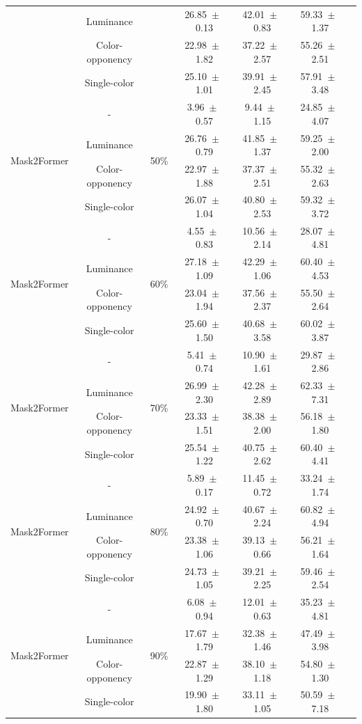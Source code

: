 \begin{table}[h]
\begin{tabular}{@{}lccc ccc@{}}
& Luminance & & 26.85~$\pm$~0.13 & 42.01~$\pm$~0.83 & 59.33~$\pm$~1.37 \\
& Color-opponency & & 22.98~$\pm$~1.82 & 37.22~$\pm$~2.57 & 55.26~$\pm$~2.51 \\
& Single-color & & 25.10~$\pm$~1.01 & 39.91~$\pm$~2.45 & 57.91~$\pm$~3.48 \\
\midrule
\multirow{4}{*}{Mask2Former} & - & \multirow{4}{*}{50\%} & 3.96~$\pm$~0.57 & 9.44~$\pm$~1.15 & 24.85~$\pm$~4.07 \\
& Luminance & & 26.76~$\pm$~0.79 & 41.85~$\pm$~1.37 & 59.25~$\pm$~2.00 \\
& Color-opponency & & 22.97~$\pm$~1.88 & 37.37~$\pm$~2.51 & 55.32~$\pm$~2.63 \\
& Single-color & & 26.07~$\pm$~1.04 & 40.80~$\pm$~2.53 & 59.32~$\pm$~3.72 \\
\midrule
\multirow{4}{*}{Mask2Former} & - & \multirow{4}{*}{60\%} & 4.55~$\pm$~0.83 & 10.56~$\pm$~2.14 & 28.07~$\pm$~4.81 \\
& Luminance & & 27.18~$\pm$~1.09 & 42.29~$\pm$~1.06 & 60.40~$\pm$~4.53 \\
& Color-opponency & & 23.04~$\pm$~1.94 & 37.56~$\pm$~2.37 & 55.50~$\pm$~2.64 \\
& Single-color & & 25.60~$\pm$~1.50 & 40.68~$\pm$~3.58 & 60.02~$\pm$~3.87 \\
\midrule
\multirow{4}{*}{Mask2Former} & - & \multirow{4}{*}{70\%} & 5.41~$\pm$~0.74 & 10.90~$\pm$~1.61 & 29.87~$\pm$~2.86 \\
& Luminance & & 26.99~$\pm$~2.30 & 42.28~$\pm$~2.89 & 62.33~$\pm$~7.31 \\
& Color-opponency & & 23.33~$\pm$~1.51 & 38.38~$\pm$~2.00 & 56.18~$\pm$~1.80 \\
& Single-color & & 25.54~$\pm$~1.22 & 40.75~$\pm$~2.62 & 60.40~$\pm$~4.41 \\
\midrule
\multirow{4}{*}{Mask2Former} & - & \multirow{4}{*}{80\%} & 5.89~$\pm$~0.17 & 11.45~$\pm$~0.72 & 33.24~$\pm$~1.74 \\
& Luminance & & 24.92~$\pm$~0.70 & 40.67~$\pm$~2.24 & 60.82~$\pm$~4.94 \\
& Color-opponency & & 23.38~$\pm$~1.06 & 39.13~$\pm$~0.66 & 56.21~$\pm$~1.64 \\
& Single-color & & 24.73~$\pm$~1.05 & 39.21~$\pm$~2.25 & 59.46~$\pm$~2.54 \\
\midrule
\multirow{4}{*}{Mask2Former} & - & \multirow{4}{*}{90\%} & 6.08~$\pm$~0.94 & 12.01~$\pm$~0.63 & 35.23~$\pm$~4.81 \\
& Luminance & & 17.67~$\pm$~1.79 & 32.38~$\pm$~1.46 & 47.49~$\pm$~3.98 \\
& Color-opponency & & 22.87~$\pm$~1.29 & 38.10~$\pm$~1.18 & 54.80~$\pm$~1.30 \\
& Single-color & & 19.90~$\pm$~1.80 & 33.11~$\pm$~1.05 & 50.59~$\pm$~7.18 \\
\midrule
\bottomrule
\end{tabular}
\label{tab:sparse_results_mask2former_dark_zurich}
\end{table}